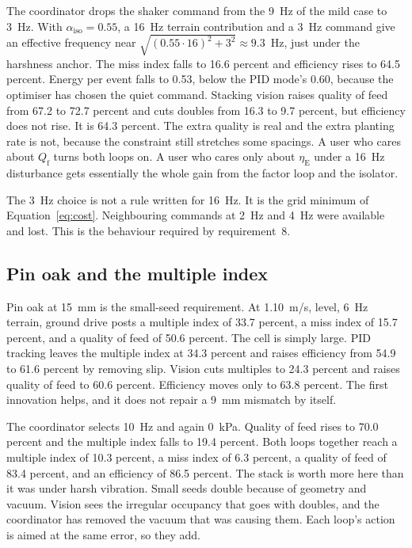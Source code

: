 The coordinator drops the shaker command from the 9~Hz of the mild case to 3~Hz. With $\alpha_{\mathrm{iso}}=0.55$, a 16~Hz terrain contribution and a 3~Hz command give an effective frequency near $\sqrt{(0.55\cdot 16)^2+3^2}\approx 9.3$~Hz, just under the harshness anchor. The miss index falls to 16.6 percent and efficiency rises to 64.5 percent. Energy per event falls to 0.53, below the PID mode's 0.60, because the optimiser has chosen the quiet command. Stacking vision raises quality of feed from 67.2 to 72.7 percent and cuts doubles from 16.3 to 9.7 percent, but efficiency does not rise. It is 64.3 percent. The extra quality is real and the extra planting rate is not, because the constraint still stretches some spacings. A user who cares about $Q_{\mathrm{f}}$ turns both loops on. A user who cares only about $\eta_{\mathrm{E}}$ under a 16~Hz disturbance gets essentially the whole gain from the factor loop and the isolator.

The 3~Hz choice is not a rule written for 16~Hz. It is the grid minimum of Equation~\eqref{eq:cost}. Neighbouring commands at 2~Hz and 4~Hz were available and lost. This is the behaviour required by requirement~8.

\subsection{Pin oak and the multiple index}

Pin oak at 15~mm is the small-seed requirement. At 1.10~m/s, level, 6~Hz terrain, ground drive posts a multiple index of 33.7 percent, a miss index of 15.7 percent, and a quality of feed of 50.6 percent. The cell is simply large. PID tracking leaves the multiple index at 34.3 percent and raises efficiency from 54.9 to 61.6 percent by removing slip. Vision cuts multiples to 24.3 percent and raises quality of feed to 60.6 percent. Efficiency moves only to 63.8 percent. The first innovation helps, and it does not repair a 9~mm mismatch by itself.

The coordinator selects 10~Hz and again 0~kPa. Quality of feed rises to 70.0 percent and the multiple index falls to 19.4 percent. Both loops together reach a multiple index of 10.3 percent, a miss index of 6.3 percent, a quality of feed of 83.4 percent, and an efficiency of 86.5 percent. The stack is worth more here than it was under harsh vibration. Small seeds double because of geometry and vacuum. Vision sees the irregular occupancy that goes with doubles, and the coordinator has removed the vacuum that was causing them. Each loop's action is aimed at the same error, so they add.

